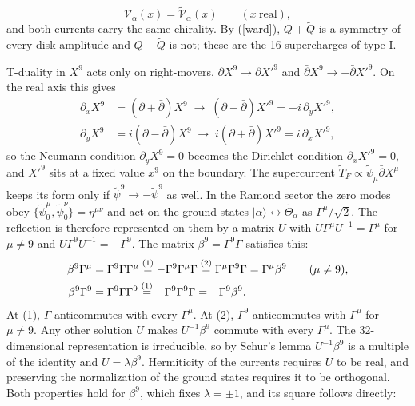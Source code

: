 \begin{tcolorbox}[breakable]
\begin{remark}
\begin{equation}
\mathcal V_\alpha(x) = \tilde{\mathcal V}_\alpha(x)\qquad (x\ \text{real}),
\tag{D.5}\label{typeIbc}
\end{equation}
and both currents carry the same chirality. By (\ref{ward}), $Q+\tilde Q$ is a symmetry of every disk amplitude and $Q-\tilde Q$ is not; these are the 16 supercharges of type I.

T-duality in $X^9$ acts only on right-movers, $\partial X^9 \to \partial X'^9$ and $\bar\partial X^9 \to -\bar\partial X'^9$. On the real axis this gives
\begin{align*}
\partial_xX^9 &= (\partial+\bar\partial)X^9 \;\to\; (\partial-\bar\partial)X'^9 = -i\,\partial_yX'^9, \\
\partial_yX^9 &= i(\partial-\bar\partial)X^9 \;\to\; i(\partial+\bar\partial)X'^9 = i\,\partial_xX'^9 ,
\end{align*}
so the Neumann condition $\partial_yX^9 = 0$ becomes the Dirichlet condition $\partial_xX'^9 = 0$, and $X'^9$ sits at a fixed value $x^9$ on the boundary. The supercurrent $\tilde T_F\propto\tilde\psi_\mu\bar\partial X^\mu$ keeps its form only if $\tilde\psi^9\to-\tilde\psi^9$ as well. In the Ramond sector the zero modes obey $\{\tilde\psi^\mu_0,\tilde\psi^\nu_0\} = \eta^{\mu\nu}$ and act on the ground states $|\alpha\rangle\leftrightarrow\tilde\Theta_\alpha$ as $\Gamma^\mu/\sqrt2$. The reflection is therefore represented on them by a matrix $U$ with $U\Gamma^\mu U^{-1} = \Gamma^\mu$ for $\mu\ne9$ and $U\Gamma^9U^{-1} = -\Gamma^9$. The matrix $\beta^9 = \Gamma^9\Gamma$ satisfies this:
\begin{align*}
\beta^9\Gamma^\mu &= \Gamma^9\Gamma\Gamma^\mu \overset{(1)}{=} -\Gamma^9\Gamma^\mu\Gamma \overset{(2)}{=} \Gamma^\mu\Gamma^9\Gamma = \Gamma^\mu\beta^9 \qquad(\mu\neq9),\\
\beta^9\Gamma^9 &= \Gamma^9\Gamma\Gamma^9 \overset{(1)}{=} -\Gamma^9\Gamma^9\Gamma = -\Gamma^9\beta^9 .
\end{align*}
At (1), $\Gamma$ anticommutes with every $\Gamma^\mu$. At (2), $\Gamma^9$ anticommutes with $\Gamma^\mu$ for $\mu\ne9$. Any other solution $U$ makes $U^{-1}\beta^9$ commute with every $\Gamma^\mu$. The 32-dimensional representation is irreducible, so by Schur's lemma $U^{-1}\beta^9$ is a multiple of the identity and $U = \lambda\beta^9$. Hermiticity of the currents requires $U$ to be real, and preserving the normalization of the ground states requires it to be orthogonal. Both properties hold for $\beta^9$, which fixes $\lambda = \pm1$, and its square follows directly:

\end{remark}
\end{tcolorbox}
